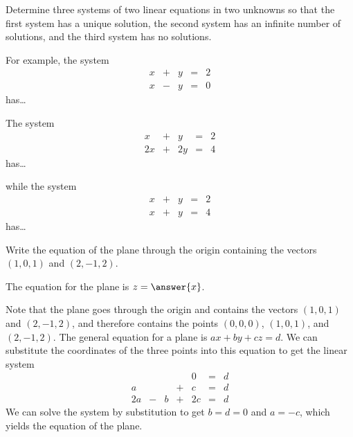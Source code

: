 \documentclass{ximera}
\begin{document}
\begin{exercise} \label{c2.2.6}
Determine three systems of two linear equations in two unknowns
so that the first system has a unique solution, the second
system has an infinite number of solutions, and the third system
has no solutions.

\begin{prompt}
  For example, the system
  \[\begin{array}{rrrrr}
x & + & y & = & 2 \\
x & - & y & = & 0\end{array}\]
has\ldots
\begin{multipleChoice}
\end{multipleChoice}

The system
\[\begin{array}{rrrrr}
x & + & y & = & 2 \\
    2x & + & 2y & = & 4\end{array}\]
has\ldots
\begin{multipleChoice}
\end{multipleChoice}
while the system
\[\begin{array}{rrrrr}
x & + & y & = & 2 \\
    x & + & y & = & 4\end{array}\]
has\ldots
\begin{multipleChoice}
\end{multipleChoice}
\end{prompt}
\end{exercise}

\begin{exercise} \label{c2.2.7}
Write the equation of the plane through the origin containing the
vectors $(1,0,1)$ and $(2,-1,2)$.
\begin{prompt}
  The equation for the plane is $z = \answer{x}$.
\end{prompt}
\begin{hint}
  Note that the plane goes through the origin and contains the
vectors $(1,0,1)$ and $(2,-1,2)$, and therefore contains the points
$(0,0,0)$, $(1,0,1)$, and $(2,-1,2)$.  The general equation for a plane
is $ax + by + cz = d$.  We can substitute the coordinates of the three
points into this equation to get the linear system
\[
\begin{array}{rrrrrrr}
 & & & & 0 & = & d \\
a & & & + & c & = & d \\
2a & - & b & + & 2c & = & d\end{array}
\]
We can solve the system by substitution to get $b = d = 0$ and $a = -c$,
which yields the equation of the plane.
\end{hint}
\end{exercise}
\end{document}
